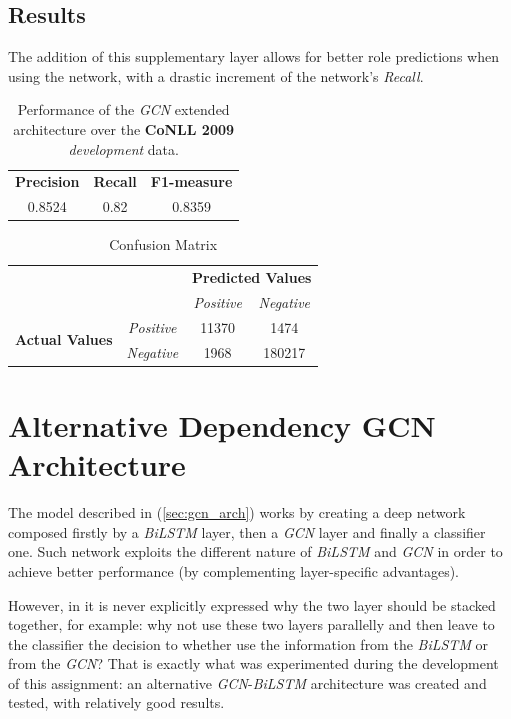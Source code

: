 \documentclass[a4paper,10pt,twocolumn]{article}
\newcommand{\BiLSTM}{\emph{BiLSTM}}
\newcommand{\GCN}{\emph{GCN}}
\begin{document}
\subsection{Results} The addition of this supplementary layer allows for better role predictions when using the network, with a drastic increment of the network's \emph{Recall}.

\begin{table}[h!]
	\centering
	\begin{tabular}{|c|c|c|}
		\hline\hline
		\textbf{Precision} & \textbf{Recall}&\textbf{F1-measure}\\
		0.8524 & 0.82 &0.8359\\
		\hline\hline
	\end{tabular}
	\caption{Performance of the \GCN{} extended architecture over the \textbf{CoNLL 2009} \emph{development} data.}
	\label{tab:gcn_perf}
\end{table}

\begin{table}[h!]
	\centering
	\begin{tabular}{cccc}
		&&\multicolumn{2}{c}{\textbf{Predicted Values}}\\
		& &\textit{Positive}&\textit{Negative}\\\cline{3-4}	
		\multirow{2}{1.1cm}{\textbf{Actual Values}} 
		& \textit{Positive}  &\multicolumn{1}{|c|}{11370} & \multicolumn{1}{|c|}{1474}\\\cline{3-4}
		& \textit{Negative} & \multicolumn{1}{|c|}{1968} & \multicolumn{1}{|c|}{180217}\\\cline{3-4}
	\end{tabular}
	\caption{Confusion Matrix}
\end{table}

\section{Alternative Dependency GCN Architecture}
The model described in \cite{gcn} (\cref{sec:gcn_arch}) works by creating a deep network composed firstly by a \BiLSTM{} layer, then a \GCN{} layer and finally a classifier one. Such network exploits the different nature of \BiLSTM{} and \GCN{} in order to achieve better performance (by complementing layer-specific advantages).

 However, in \cite{gcn} it is never explicitly expressed why the  two layer should be stacked together, for example: why not use these two layers parallelly and then leave to the classifier the decision to whether use the information from the \BiLSTM{} or from the \GCN{}? That is exactly what was experimented during the development of this assignment: an alternative \GCN{}-\BiLSTM{} architecture was created and tested, with relatively good results.
\end{document}
